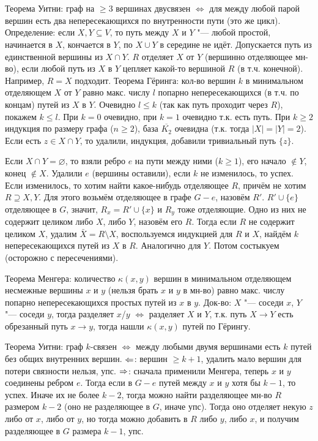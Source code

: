 \section{} %
	Теорема Уитни: граф на $\ge 3$ вершинах двусвязен $\iff$ для между любой парой вершин
	есть два непересекающихся по внутренности пути (это же цикл).
	Определение: если $X, Y \subseteq V$, то путь между $X$ и $Y$ "--- любой простой,
	начинается в $X$, кончается в $Y$, по $X \cup Y$ в середине не идёт.
	Допускается путь из единственной вершины из $X \cap Y$.
	$R$ отделяет $X$ от $Y$ (вершинно отделяющее мн-во), если любой путь из $X$ в $Y$
	цепляет какой-то вершиной $R$ (в т.ч. конечной).
	Например, $R=X$ подходит.
	Теорема Гёринга: кол-во вершин $k$ в минимальном отделяющем $X$ от $Y$ равно макс. числу $l$ попарно
	непересекающихся (в т.ч. по концам) путей из $X$ в $Y$.
	Очевидно $l \le k$ (так как путь проходит через $R$), покажем $k \le l$.
	При $k=0$ очевидно, при $k=1$ очевидно т.к. есть путь.
	При $k\ge 2$ индукция по размеру графа ($n \ge 2$), база $\overline{K_2}$ очевидна (т.к. тогда $|X|=|Y|=2$).
	Если есть $z\in X \cap Y$, то удалили, индукция, добавили тривиальный путь $\{z\}$.

	Если $X \cap Y =\varnothing$, то взяли ребро $e$ на пути между ними ($k \ge 1$), его начало $\notin Y$, конец $\notin X$.
	Удалили $e$ (вершины оставили), если $k$ не изменилось, то успех.
	Если изменилось, то хотим найти какое-нибудь отделяющее $R$, причём не хотим $R \supseteq X, Y$.
	Для этого возьмём отделяющее в графе $G-e$, назовём $R'$.
	$R' \cup \{e\}$ отделяющее в $G$, значит, $R_x=R'\cup\{x\}$ и $R_y$ тоже отделяющие.
	Одно из них не содержит целиком либо $X$, либо $Y$, назовём его $R$.
	Тогда если $R$ не содержит целиком $X$, удалим $\bar X=R\setminus X$, воспользуемся индукцией для $R$ и $X$,
	найдём $k$ непересекающихся путей из $X$ в $R$.
	Аналогично для $Y$.
	Потом состыкуем (осторожно с пересечениями).

	Теорема Менгера: количество $\kappa(x, y)$ вершин в минимальном отделяющем несмежные вершины $x$ и $y$ (нельзя брать $x$ и $y$ в мн-во)
	равно макс. числу попарно непересекающихся простых путей из $x$ в $y$.
	Док-во: $X$ "--- соседи $x$, $Y$ "--- соседи $y$, тогда разделяет $x$/$y$ $\iff$ разделяет $X$ и $Y$,
	т.к. путь $X \to Y$ есть обрезанный путь $x \to y$, тогда нашли $\kappa(x, y)$ путей по Гёрингу.

	Теорема Уитни: граф $k$-связен $\iff$ между любыми двумя вершинами есть $k$ путей без общих внутренних вершин.
	$\Leftarrow$: вершин $\ge k+1$, удалить мало вершин для потери связности нельзя, упс.
	$\Rightarrow$: сначала применили Менгера, теперь $x$ и $y$ соединены ребром $e$.
	Тогда если в $G-e$ путей между $x$ и $y$ хотя бы $k-1$, то успех.
	Иначе их не более $k-2$, тогда можно найти разделяющее мн-во $R$ размером $k-2$ (оно не разделяющее в $G$, иначе упс).
	Тогда оно отделяет некую $z$ либо от $x$, либо от $y$, но тогда можно добавить в $R$ либо $y$, либо $x$, и получим разделяющее в $G$ размера $k-1$, упс.
